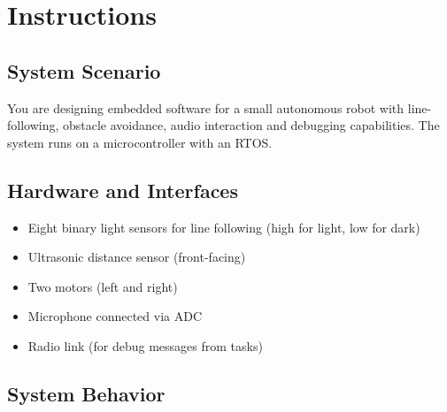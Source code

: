\section*{Instructions}

\vspace*{-1.5em}
\subsection*{System Scenario}
\vspace*{-0.5em}

You are designing embedded software for a small autonomous robot with line-following, obstacle avoidance, audio interaction and debugging capabilities.
The system runs on a microcontroller with an RTOS.\@

\vspace*{-1.5em}
\subsection*{Hardware and Interfaces}
\vspace*{-0.5em}

\begin{itemize}[noitemsep, topsep=0pt]
    \item Eight binary light sensors for line following (high for light, low for dark)
    \item Ultrasonic distance sensor (front-facing)
    \item Two motors (left and right)
    \item Microphone connected via ADC
    \item Radio link (for debug messages from tasks)
\end{itemize}

\vspace*{-1.5em}
\subsection*{System Behavior}
\vspace*{-0.5em}

